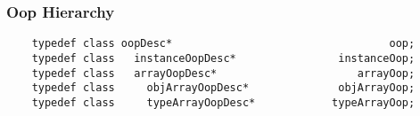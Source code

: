 \subsubsection{Oop Hierarchy}
\label{summarization:jvm:oop_hierarchy}

\begin{center}
  \begin{verbatim}
    typedef class oopDesc*                                  oop;
    typedef class   instanceOopDesc*                instanceOop;
    typedef class   arrayOopDesc*                      arrayOop;
    typedef class     objArrayOopDesc*              objArrayOop;
    typedef class     typeArrayOopDesc*            typeArrayOop;
  \end{verbatim}
\end{center}